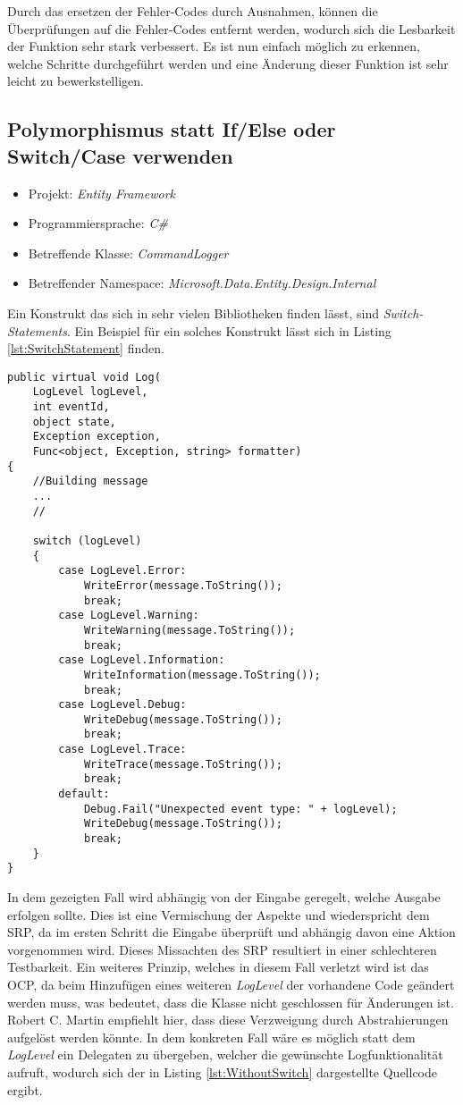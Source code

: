 \SuperPar Durch das ersetzen der Fehler-Codes durch Ausnahmen, können die Überprüfungen auf die Fehler-Codes entfernt werden, wodurch sich die Lesbarkeit der Funktion sehr stark verbessert. Es ist nun einfach möglich zu erkennen, welche Schritte durchgeführt werden und eine Änderung dieser Funktion ist sehr leicht zu bewerkstelligen. 

\subsection{Polymorphismus statt If/Else oder Switch/Case verwenden}
\begin{itemize}
	\item Projekt: \textit{Entity Framework}
	\item Programmiersprache: \textit{C\#}
	\item Betreffende Klasse: \textit{CommandLogger }
	\item Betreffender Namespace: \textit{Microsoft.Data.Entity.Design.Internal}
\end{itemize}
\SuperPar Ein Konstrukt das sich in sehr vielen Bibliotheken finden lässt, sind \textit{Switch-Statements}. Ein Beispiel für ein solches Konstrukt lässt sich in  Listing \ref{lst:SwitchStatement} finden.

\begin{lstlisting}[language={[Sharp]C}, caption=Beispiele für Switch Statement, label=lst:SwitchStatement]
public virtual void Log(
	LogLevel logLevel,
	int eventId,
	object state,
	Exception exception,
	Func<object, Exception, string> formatter)
{
	//Building message
	...
	//

	switch (logLevel)
	{
		case LogLevel.Error:
			WriteError(message.ToString());
			break;
		case LogLevel.Warning:
			WriteWarning(message.ToString());
			break;
		case LogLevel.Information:
			WriteInformation(message.ToString());
			break;
		case LogLevel.Debug:
			WriteDebug(message.ToString());
			break;
		case LogLevel.Trace:
			WriteTrace(message.ToString());
			break;
		default:
			Debug.Fail("Unexpected event type: " + logLevel);
			WriteDebug(message.ToString());
			break;
	}
}
\end{lstlisting}

\SuperPar In dem gezeigten Fall wird abhängig von der Eingabe geregelt, welche Ausgabe erfolgen sollte. Dies ist eine Vermischung der Aspekte und wiederspricht dem SRP, da im ersten Schritt die Eingabe überprüft und abhängig davon eine Aktion vorgenommen wird. Dieses Missachten des SRP resultiert in einer schlechteren Testbarkeit. Ein weiteres Prinzip, welches in diesem Fall verletzt wird ist das OCP, da beim Hinzufügen eines weiteren \textit{LogLevel} der vorhandene Code geändert werden muss, was bedeutet, dass die Klasse nicht geschlossen für Änderungen ist. Robert C. Martin empfiehlt hier, dass diese Verzweigung durch Abstrahierungen aufgelöst werden könnte. In dem konkreten Fall wäre es möglich statt dem \textit{LogLevel} ein Delegaten zu übergeben, welcher die gewünschte Logfunktionalität aufruft, wodurch sich der in Listing \ref{lst:WithoutSwitch} dargestellte Quellcode ergibt.

